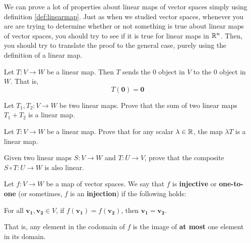 We can prove a lot of properties about linear maps of vector spaces simply using definition \ref{def:linearmap}.  Just as when we studied vector spaces, whenever you are are trying to determine whether or not something is true about linear maps of vector spaces, you should try to see if it is true for linear maps in $\mathbb{R}^n$.  Then, you should try to translate the proof to the general case, purely using the definition of a linear map.

\begin{proposition}
Let $T: V \to W$ be a linear map.  Then $T$ sends the 0 object in $V$ to the 0 object in $W$.  That is, $$T(\bm{0}) = \bm{0}$$
\end{proposition}


\begin{proposition}
Let $T_1, T_2: V \to W$ be two linear maps.  Prove that the sum of two linear maps $T_1 + T_2$ is a linear map.
\end{proposition}

\begin{proposition}
Let $T: V \to W$ be a linear map.  Prove that for any scalar $\lambda \in \mathbb{R}$, the map $\lambda T$ is a linear map.
\end{proposition}

\begin{proposition}\label{propcomposite}
    Given two linear maps $S: V \to W$ and $T : U \to V$, prove that the composite $S \circ T : U \to W$ is also linear.
\end{proposition}




\begin{definition}
    Let $f: V \to W$ be a map of vector spaces.  We say that $f$ is \textbf{injective} or \textbf{one-to-one} (or sometimes, $f$ is an \textbf{injection}) if the following holds:
    
    \begin{center}
        
    For all $\bm{v_1}, \bm{v_2} \in V$, if $f(\bm{v_1}) = f(\bm{v_2})$, then $\bm{v_1} = \bm{v_2}$.
    \end{center}
    
    That is, any element in the codomain of $f$ is the image of \textbf{at most} one element in its domain.  
\end{definition}



